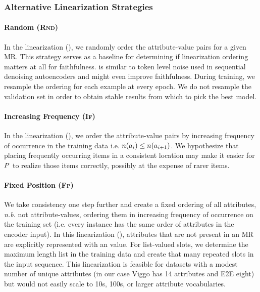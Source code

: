 \subsubsection{Alternative Linearization Strategies}

\paragraph{Random (\textsc{Rnd})} In the  linearization (), we randomly
order the attribute-value pairs for a given MR. This strategy 
serves as a baseline for determining
if linearization ordering matters at all for faithfulness.  
is similar to token level noise used in
sequential denoising autoencoders \cite{wang2019denoising} and might even improve faithfulness.
During training, we resample the ordering for each example at every epoch.
We do not resample the validation set in order to obtain stable results 
from which to pick the best model.

\paragraph{Increasing Frequency (\textsc{If})} 
In the  linearization (), 
we order the attribute-value pairs by increasing frequency of 
occurrence in the training data
i.e. $n(a_i) \le n(a_{i+1})$.
We hypothesize that placing frequently occurring items in a consistent location
may make it easier for $P$ to realize those items correctly, possibly
at the expense of rarer items.

\paragraph{Fixed Position (\textsc{Fp})} We take  consistency one step further 
and create a fixed ordering of all attributes, \textit{n.b.} not attribute-values, ordering them in increasing
frequency of occurrence on the training set (i.e. every instance has the same
order of attributes in the encoder input). In this 
linearization (), attributes that are not present 
in an MR are explicitly represented with an  value. 
For list-valued slots, we determine the maximum length list in the training
data and create that many repeated slots in the input sequence.
This linearization is feasible for datasets with a modest number of 
unique attributes (in our case Viggo has 14 attributes and
E2E eight) but would not easily scale to 10s, 100s, or larger
attribute vocabularies. 




